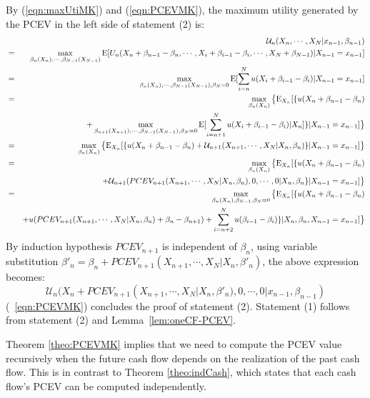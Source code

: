 \documentclass{article}[12pt letter]
\newcommand{\E}{\mathrm{E}}
\begin{document}
By (\ref{eqn:maxUtiMK}) and (\ref{eqn:PCEVMK}), the maximum utility generated by the PCEV in the left side of statement (2) is:
\begin{eqnarray*}
    &&\mathcal{U}_n(X_n,\cdots, X_{N}|x_{n-1},\beta_{n-1}) \nonumber \\
    & =& \max_{\beta_n(X_n), \cdots, \beta_{N-1}(X_{N-1})} \E [U_n(X_n+\beta_{n-1}-\beta_n, \cdots, X_i + \beta_{i-1}-\beta_i, \cdots, X_N + \beta_{N-1})|X_{n-1}=x_{n-1} ]\\
    &=&\max_{\beta_n(X_n), \cdots, \beta_{N-1}(X_{N-1}), \beta_N=0} \E [\sum_{i=n}^Nu(X_i + \beta_{i-1}-\beta_i)|X_{n-1}=x_{n-1}] \\
    &=& \max_{\beta_n(X_n)} \big{\{}\E_{X_n} [ \{u(X_n + \beta_{n-1} - \beta_{n})\\ && +\max_{\beta_{n+1}(X_{n+1}),  \cdots, \beta_{N-1}(X_{N-1}), \beta_N=0}\E [\sum_{i=n+1}^Nu(X_i + \beta_{i-1}-\beta_i)|X_{n}]\}|X_{n-1}=x_{n-1}]\big{\}} \\
    &=& \max_{\beta_n(X_n)} \big{\{}\E_{X_n} [ \{u(X_n + \beta_{n-1} - \beta_{n}) + \mathcal{U}_{n+1}(X_{n+1},\cdots, X_N|X_n,\beta_n)\}|X_{n-1}=x_{n-1}]\big{\}} \\
    &=&  \max_{\beta_n(X_n)} \big{\{}\E_{X_n} [ \{u(X_n + \beta_{n-1} - \beta_{n})\\
    &&  + \mathcal{U}_{n+1}(PCEV_{n+1}(X_{n+1},\cdots, X_N|X_n,\beta_n),0,\cdots,0|X_n,\beta_n\}|X_{n-1}=x_{n-1}]\big{\}}\\
    &=& \max_{\beta_n(X_n), \beta_{N-1},\beta_N=0 } \big{\{}\E_{X_n} [ \{u(X_n + \beta_{n-1} - \beta_{n})  \\
&& + u(PCEV_{n+1}(X_{n+1},\cdots, X_N|X_n,\beta_n) + \beta_n-\beta_{n+1})
+\sum_{i=n+2}^N u(\beta_{i-1}-\beta_i)\}|X_n, \beta_n, X_{n-1}=x_{n-1}]\big{\}}
\end{eqnarray*}
By induction hypothesis $PCEV_{n+1}$ is independent of $\beta_n$, using variable substitution $\beta'_n = \beta_n + PCEV_{n+1}(X_{n+1},\cdots, X_N|X_n,\beta'_n)$, the above expression becomes:
\[ \mathcal{U}_n(X_n + PCEV_{n+1}(X_{n+1},\cdots,X_N|X_n,\beta'_n), 0, \cdots, 0|x_{n-1},\beta_{n-1}) \]
(~\ref{eqn:PCEVMK}) concludes the proof of statement (2).  Statement (1) follows from  statement (2) and Lemma~\ref{lem:oneCF-PCEV}.
\endproof

Theorem \ref{theo:PCEVMK} implies that we need to compute the PCEV value recursively when the future cash flow depends on the realization of the past cash flow. This is in contrast to Theorem \ref{theo:indCash}, which states that each cash flow's PCEV can be computed independently.
\end{document}
